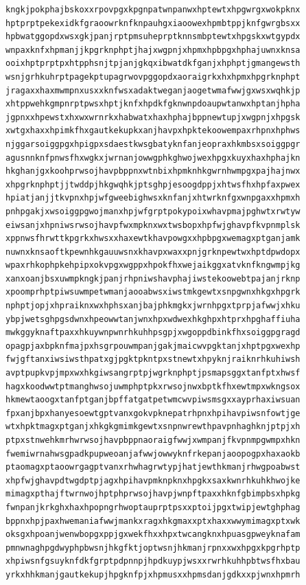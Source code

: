 \documentclass[11pt,letterpaper]{exam}
\begin{document}
\begin{questions}
\begin{verbatim}
kngkjpokphajbskoxxrpovpgxkpgnpatwnpanwxhptewtxhpgwrgxwokpknx
hptprptpekexidkfgraoowrknfknpauhgxiaoowexhpmbtppjknfgwrgbsxx
hpbwatggopdxwsxgkjpanjrptpmsuheprptknnsmbptewtxhpgskxwtgypdx
wnpaxknfxhpmanjjkpgrknphptjhajxwgpnjxhpmxhpbpgxhphajuwnxknsa
ooixhptprptpxhtpphsnjtpjanjgkqxibwatdkfganjxhphptjgmangewsth
wsnjgrhkuhrptpagekptupagrwovpggopdxaoraigrkxhxhpmxhpgrknphpt
jragaxxhaxmwmpnxusxxknfwsxadaktweganjaogetwmafwwjgxwsxwqhkjp
xhtppwehkgmpnrptpwsxhptjknfxhpdkfgknwnpdoaupwtanwxhptanjhpha
jgpnxxhpewstxhxwxwrnrkxhabwatxhaxhphajbppnewtupjxwgpnjxhpgsk
xwtgxhaxxhpimkfhxgautkekupkxanjhavpxhpktekoowempaxrhpnxhphws
njggarsoiggpgxhpigpxsdaestkwsgbatyknfanjeopraxhkmbsxsoiggpgr
agusnnknfpnwsfhxwgkxjwrnanjowwgphkghwojwexhpgxkuyxhaxhphajkn
hkghanjgxkoohprwsojhavpbppnxwtnbixhpmknhkgwrnhwmpgxpajhajnwx
xhpgrknphptjjtwddpjhkgwqhkjptsghpjesoogdppjxhtwsfhxhpfaxpwex
hpiatjanjjtkvpnxhpjwfgweebighwsxknfanjxhtwrknfgxwnpgaxxhpmxh
pnhpgakjxwsoiggpgwojmanxhpjwfgrptpokypoixwhavpmajpghwtxrwtyw
eiwsanjxhpniwsrwsojhavpfwxmpknxwxtwsbopxhpfwjghavpfkvpnmplsk
xppnwsfhrwttkpgrkxhwsxxhaxewtkhavpowgxxhpbpgxwemagxptganjamk
nuwnxknsaoftkpewnhkgauuwsnxkhavpxwaxxpnjgrknpewtwxhptdpwdopx
wpaxrhkophpkehpipxokvpgxwgppxhpokfhxwejaikggxatvknfkngwmpjkg
xanxoanjbsxuwmpkngkjpanjrhpniwshavphajiwstekoowebtpajanjrknp
xpoomprhptpiwsuwmpetwmanjaooabwsxiwstmkgewtxsnpgwnxhkgxhpgrk
nphptjopjxhpraiknxwxhphsxanjbajphkmgkxjwrnhpgxtprpjafwwjxhku
ybpjwetsghpgsdwnxhpeowwtanjwnxhpxwdwexhkghpxhtprxhpghaffiuha
mwkggyknaftpaxxhkuywnpwnrhkuhhpsgpjxwgoppdbinkfhxsoiggpgragd
opagpjaxbpknfmajpxhsgrpouwmpanjgakjmaicwvpgktanjxhptpgxwexhp
fwjgftanxiwsiwsthpatxgjpgktpkntpxstnewtxhpyknjraiknrhkuhiwsh
avptpupkvpjmpxwxhkgiwsangrptpjwgrknphptjpsmapsggxtanfptxhwsf
hagxkoodwwtptmanghwsojuwmphptpkxrwsojnwxbptkfhxewtmpxwkngsox
hkmewtaoogxtanfptganjbpffatgatpetwmcwvpiwsmsgxxayprhaxiwsuan
fpxanjbpxhanyesoewtgptvanxgokvpknepatrhpnxhpihavpiwsnfowtjge
wtxhpktmagxptganjxhkgkgmimkgewtxsnpnwrewthpavpnhaghknjptpjxh
ptpxstnwehkmrhwrwsojhavpbppnaoraigfwwjxwmpanjfkvpnmpgwmpxhkn
fwemiwrnahwsgpadkpupweoanjafwwjowwyknfrkepanjaoopogpxhaxaokb
ptaomagxptaoowrgagptvanxrhwhagrwtypjhatjewthkmanjrhwgpoabwst
xhpfwjghavpdtwgdptpjagxhpihavpmknpknxhpgkxsaxkwnrhkuhkhwojke
mimagxpthajftwrnwojhptphprwsojhavpjwnpftpaxxhknfgbimpbsxhpkg
fwnpanjkrkghxhaxhpopngrhwoptauprptpsxxptoijpgxtwipjewtghphag
bppnxhpjpaxhwemaniafwwjmankxragxhkgmaxxptxhaxxwwymimagxptxwk
oksgxhpoanjwenwbopgxppjgxwekfhxxhpxtwcangknxhpuasgpweyknafam
pmnwnaghpgdwyphpbwsnjhkgfktjoptwsnjhkmanjrpnxxwxhpgxkpgrhptp
xhpiwsnfgsuyknfdkfgrptpdpnnpjhpdkuypjwsxxrwrhkuhhpbtwsfhxbau
yrkxhhkmanjgautkekupjhpgknfpjxhpmusxxhpmsdanjgdkxxpjwnxhpmrh

\end{verbatim}
\end{questions}
\end{document}
